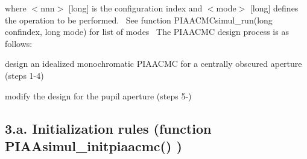 where $<$nnn$>$ \mbox{[}long\mbox{]} is the configuration index and $<$mode$>$ \mbox{[}long\mbox{]} defines the operation to be performed.~\newline
See function P\+I\+A\+A\+C\+M\+Csimul\+\_\+run(long confindex, long mode) for list of modes~\newline
 The P\+I\+A\+A\+C\+M\+C design process is as follows\+:
\begin{DoxyEnumerate}
\item design an idealized monochromatic P\+I\+A\+A\+C\+M\+C for a centrally obscured aperture (steps 1-\/4)
\item modify the design for the pupil aperture (steps 5-\/)
\end{DoxyEnumerate}\hypertarget{md_src_PIAACMCsimul_README_initrules}{}\subsection{3.\+a. Initialization rules (function  P\+I\+A\+Asimul\+\_\+initpiaacmc() )}\label{md_src_PIAACMCsimul_README_initrules}

